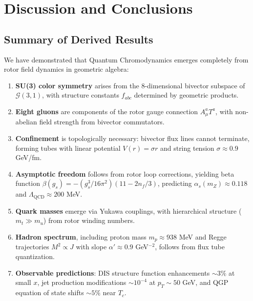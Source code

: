 \documentclass[11pt,a4paper]{article}
\newcommand{\Cl}{\mathcal{G}}
\theoremstyle{definition}
\theoremstyle{plain}
\theoremstyle{remark}
\begin{document}
\section{Discussion and Conclusions}
\label{sec:discussion}

\subsection{Summary of Derived Results}

We have demonstrated that Quantum Chromodynamics emerges completely from rotor field dynamics in geometric algebra:

\begin{enumerate}[leftmargin=*,itemsep=3pt]
  \item \textbf{SU(3) color symmetry} arises from the 8-dimensional bivector subspace of $\Cl(3,1)$, with structure constants $f_{abc}$ determined by geometric products.

  \item \textbf{Eight gluons} are components of the rotor gauge connection $A_\mu^a T^a$, with non-abelian field strength from bivector commutators.

  \item \textbf{Confinement} is topologically necessary: bivector flux lines cannot terminate, forming tubes with linear potential $V(r) = \sigma r$ and string tension $\sigma \approx 0.9$ GeV/fm.

  \item \textbf{Asymptotic freedom} follows from rotor loop corrections, yielding beta function $\beta(g_s) = -(g_s^3/16\pi^2)(11 - 2n_f/3)$, predicting $\alpha_s(m_Z) \approx 0.118$ and $\Lambda_{\mathrm{QCD}} \approx 200$ MeV.

  \item \textbf{Quark masses} emerge via Yukawa couplings, with hierarchical structure ($m_t \gg m_u$) from rotor winding numbers.

  \item \textbf{Hadron spectrum}, including proton mass $m_p \approx 938$ MeV and Regge trajectories $M^2 \propto J$ with slope $\alpha' \approx 0.9$ GeV$^{-2}$, follows from flux tube quantization.

  \item \textbf{Observable predictions}: DIS structure function enhancements $\sim 3\%$ at small $x$, jet production modifications $\sim 10^{-4}$ at $p_T \sim 50$ GeV, and QGP equation of state shifts $\sim 5\%$ near $T_c$.
\end{enumerate}
\end{document}
